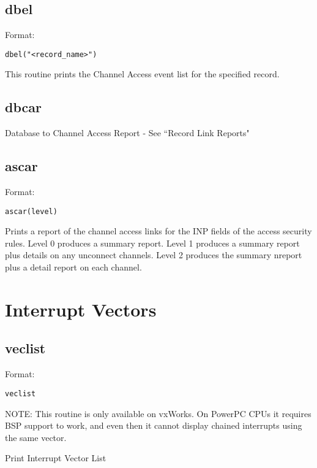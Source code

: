 \subsection{dbel}

Format:

\begin{verbatim}
dbel("<record_name>")
\end{verbatim}

This routine prints the Channel Access event list for the specified record.

\subsection{dbcar}

Database to Channel Access Report - See ``Record Link Reports"

\subsection{ascar}

Format:

\begin{verbatim}
ascar(level)
\end{verbatim}

Prints a report of the channel access links for the INP fields of the access security rules. Level 0 produces a summary 
report. Level 1 produces a summary report plus details on any unconnect channels. Level 2 produces the summary nreport 
plus a detail report on each channel.

\section{Interrupt Vectors}

\subsection{veclist}

Format:

\begin{verbatim}
veclist
\end{verbatim}

NOTE: This routine is only available on vxWorks. On PowerPC CPUs it requires BSP support to work, and even then it 
cannot display chained interrupts using the same vector.

Print Interrupt Vector List

